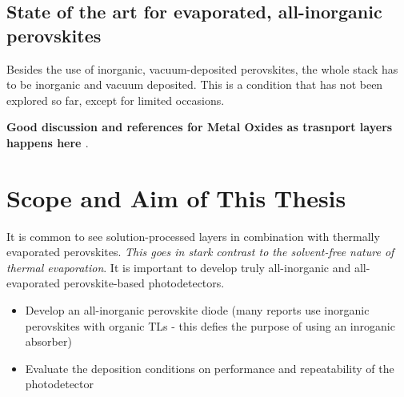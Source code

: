 \subsection{State of the art for evaporated, all-inorganic perovskites}

Besides the use of inorganic, vacuum-deposited perovskites, the whole stack has to be inorganic and vacuum deposited. This is a condition that has not been explored so far, except for limited occasions. 

\textbf{Good discussion and references for Metal Oxides as trasnport layers happens here \cite{Yang2023InvertedPassivation}}.


\section{Scope and Aim of This Thesis}

It is common to see solution-processed layers in combination with thermally evaporated perovskites. \textit{This goes in stark contrast to the solvent-free nature of thermal evaporation}. It is important to develop truly all-inorganic and all-evaporated perovskite-based photodetectors. 



\begin{itemize}
    \item Develop an all-inorganic perovskite diode (many reports use inorganic perovskites with organic TLs - this defies the purpose of using an inroganic absorber)
    \item Evaluate the deposition conditions on performance and repeatability of the photodetector
\end{itemize}


\cleardoublepage

